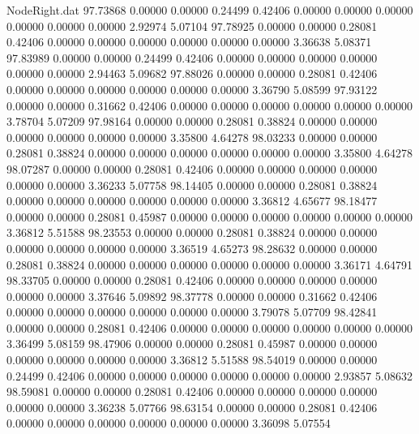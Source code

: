 \begin{filecontents}{NodeRight.dat}
  97.73868    0.00000    0.00000     0.24499    0.42406    0.00000    0.00000    0.00000    0.00000    0.00000    0.00000    2.92974    5.07104
  97.78925    0.00000    0.00000     0.28081    0.42406    0.00000    0.00000    0.00000    0.00000    0.00000    0.00000    3.36638    5.08371
  97.83989    0.00000    0.00000     0.24499    0.42406    0.00000    0.00000    0.00000    0.00000    0.00000    0.00000    2.94463    5.09682
  97.88026    0.00000    0.00000     0.28081    0.42406    0.00000    0.00000    0.00000    0.00000    0.00000    0.00000    3.36790    5.08599
  97.93122    0.00000    0.00000     0.31662    0.42406    0.00000    0.00000    0.00000    0.00000    0.00000    0.00000    3.78704    5.07209
  97.98164    0.00000    0.00000     0.28081    0.38824    0.00000    0.00000    0.00000    0.00000    0.00000    0.00000    3.35800    4.64278
  98.03233    0.00000    0.00000     0.28081    0.38824    0.00000    0.00000    0.00000    0.00000    0.00000    0.00000    3.35800    4.64278
  98.07287    0.00000    0.00000     0.28081    0.42406    0.00000    0.00000    0.00000    0.00000    0.00000    0.00000    3.36233    5.07758
  98.14405    0.00000    0.00000     0.28081    0.38824    0.00000    0.00000    0.00000    0.00000    0.00000    0.00000    3.36812    4.65677
  98.18477    0.00000    0.00000     0.28081    0.45987    0.00000    0.00000    0.00000    0.00000    0.00000    0.00000    3.36812    5.51588
  98.23553    0.00000    0.00000     0.28081    0.38824    0.00000    0.00000    0.00000    0.00000    0.00000    0.00000    3.36519    4.65273
  98.28632    0.00000    0.00000     0.28081    0.38824    0.00000    0.00000    0.00000    0.00000    0.00000    0.00000    3.36171    4.64791
  98.33705    0.00000    0.00000     0.28081    0.42406    0.00000    0.00000    0.00000    0.00000    0.00000    0.00000    3.37646    5.09892
  98.37778    0.00000    0.00000     0.31662    0.42406    0.00000    0.00000    0.00000    0.00000    0.00000    0.00000    3.79078    5.07709
  98.42841    0.00000    0.00000     0.28081    0.42406    0.00000    0.00000    0.00000    0.00000    0.00000    0.00000    3.36499    5.08159
  98.47906    0.00000    0.00000     0.28081    0.45987    0.00000    0.00000    0.00000    0.00000    0.00000    0.00000    3.36812    5.51588
  98.54019    0.00000    0.00000     0.24499    0.42406    0.00000    0.00000    0.00000    0.00000    0.00000    0.00000    2.93857    5.08632
  98.59081    0.00000    0.00000     0.28081    0.42406    0.00000    0.00000    0.00000    0.00000    0.00000    0.00000    3.36238    5.07766
  98.63154    0.00000    0.00000     0.28081    0.42406    0.00000    0.00000    0.00000    0.00000    0.00000    0.00000    3.36098    5.07554

\end{filecontents}
